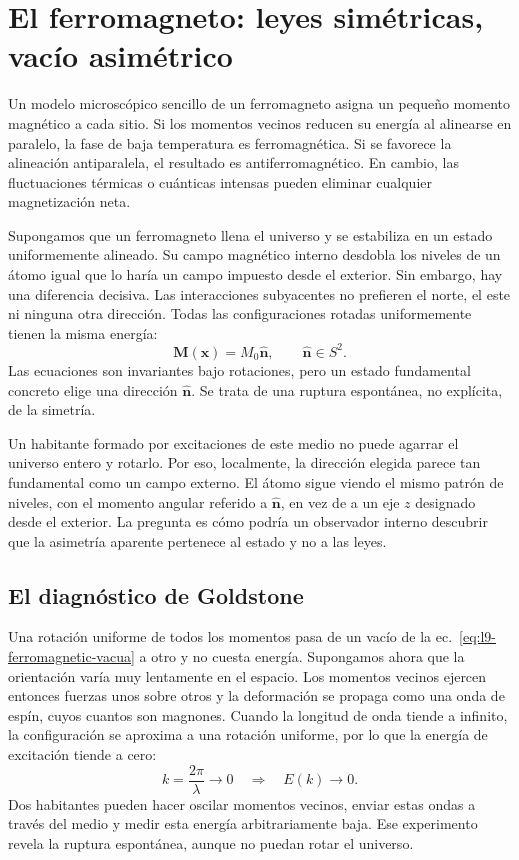 \section{El ferromagneto: leyes simétricas, vacío asimétrico}

Un modelo microscópico sencillo de un ferromagneto asigna un pequeño momento magnético a cada sitio. Si los momentos vecinos reducen su energía al alinearse en paralelo, la fase de baja temperatura es ferromagnética. Si se favorece la alineación antiparalela, el resultado es antiferromagnético. En cambio, las fluctuaciones térmicas o cuánticas intensas pueden eliminar cualquier magnetización neta.

Supongamos que un ferromagneto llena el universo y se estabiliza en un estado uniformemente alineado. Su campo magnético interno desdobla los niveles de un átomo igual que lo haría un campo impuesto desde el exterior. Sin embargo, hay una diferencia decisiva. Las interacciones subyacentes no prefieren el norte, el este ni ninguna otra dirección. Todas las configuraciones rotadas uniformemente tienen la misma energía:
\begin{equation}
\mathbf M(\mathbf x)=M_0\hat{\mathbf n},
\qquad
\hat{\mathbf n}\in S^2.
\label{eq:l9-ferromagnetic-vacua}
\end{equation}
Las ecuaciones son invariantes bajo rotaciones, pero un estado fundamental concreto elige una dirección \(\hat{\mathbf n}\). Se trata de una ruptura espontánea, no explícita, de la simetría.

Un habitante formado por excitaciones de este medio no puede agarrar el universo entero y rotarlo. Por eso, localmente, la dirección elegida parece tan fundamental como un campo externo. El átomo sigue viendo el mismo patrón de niveles, con el momento angular referido a \(\hat{\mathbf n}\), en vez de a un eje \(z\) designado desde el exterior. La pregunta es cómo podría un observador interno descubrir que la asimetría aparente pertenece al estado y no a las leyes.

\subsection{El diagnóstico de Goldstone}

Una rotación uniforme de todos los momentos pasa de un vacío de la ec.~\eqref{eq:l9-ferromagnetic-vacua} a otro y no cuesta energía. Supongamos ahora que la orientación varía muy lentamente en el espacio. Los momentos vecinos ejercen entonces fuerzas unos sobre otros y la deformación se propaga como una onda de espín, cuyos cuantos son magnones. Cuando la longitud de onda tiende a infinito, la configuración se aproxima a una rotación uniforme, por lo que la energía de excitación tiende a cero:
\begin{equation}
k=\frac{2\pi}{\lambda}\longrightarrow0
\quad\Longrightarrow\quad
E(k)\longrightarrow0.
\label{eq:l9-gapless-magnon}
\end{equation}
Dos habitantes pueden hacer oscilar momentos vecinos, enviar estas ondas a través del medio y medir esta energía arbitrariamente baja. Ese experimento revela la ruptura espontánea, aunque no puedan rotar el universo.

